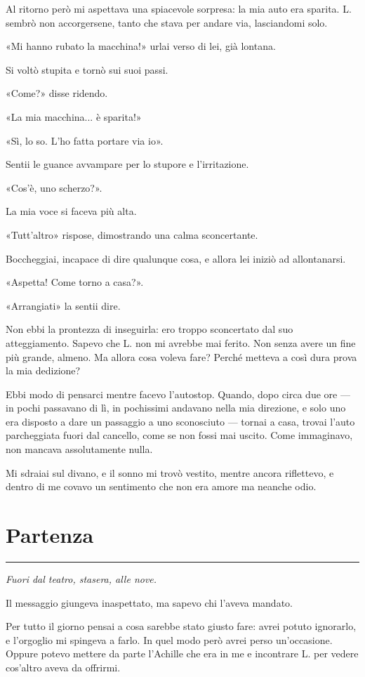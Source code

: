 \documentclass[a4paper,11pt,oneside,openright,final]{memoir}
\begin{document}
Al ritorno però mi aspettava una spiacevole sorpresa: la mia auto era sparita.
L. sembrò non accorgersene, tanto che stava per andare via, lasciandomi solo.

«Mi hanno rubato la macchina!» urlai verso di lei, già lontana.

Si voltò stupita e tornò sui suoi passi.

«Come?» disse ridendo.

«La mia macchina... è sparita!»

«Sì, lo so. L'ho fatta portare via io».

Sentii le guance avvampare per lo stupore e l'irritazione.

«Cos'è, uno scherzo?».

La mia voce si faceva più alta.

«Tutt'altro» rispose, dimostrando una calma sconcertante.

Boccheggiai, incapace di dire qualunque cosa, e allora lei iniziò ad
allontanarsi.

«Aspetta! Come torno a casa?».

«Arrangiati» la sentii dire.

Non ebbi la prontezza di inseguirla: ero troppo sconcertato dal suo
atteggiamento. Sapevo che L. non mi avrebbe mai ferito. Non senza avere un fine
più grande, almeno. Ma allora cosa voleva fare? Perché metteva a così dura prova
la mia dedizione?

Ebbi modo di pensarci mentre facevo l'autostop. Quando, dopo circa due ore ---
in pochi passavano di lì, in pochissimi andavano nella mia direzione, e solo
uno era disposto a dare un passaggio a uno sconosciuto --- tornai a casa, trovai
l'auto parcheggiata fuori dal cancello, come se non fossi mai uscito. Come
immaginavo, non mancava assolutamente nulla.

Mi sdraiai sul divano, e il sonno mi trovò vestito, mentre ancora riflettevo, e
dentro di me covavo un sentimento che non era amore ma neanche odio.

\chapter{Partenza}

\plainbreak{1}

\emph{Fuori dal teatro, stasera, alle nove.}

Il messaggio giungeva inaspettato, ma sapevo chi l'aveva mandato.

Per tutto il giorno pensai a cosa sarebbe stato giusto fare: avrei potuto
ignorarlo, e l'orgoglio mi spingeva a farlo. In quel modo però avrei perso
un'occasione. Oppure potevo mettere da parte l'Achille che era in me e
incontrare L. per vedere cos'altro aveva da offrirmi.
\end{document}
